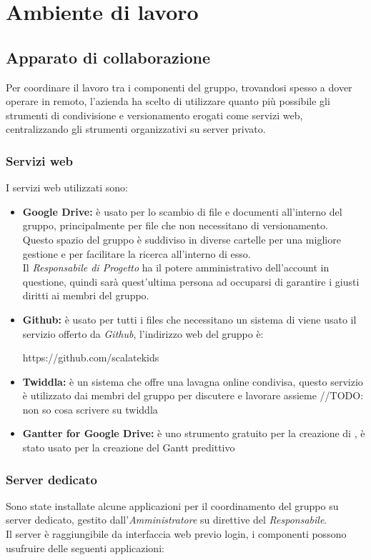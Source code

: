 \documentclass{scalatekids-article}
\begin{document}
\section{Ambiente di lavoro}
\subsection{Apparato di collaborazione}
Per coordinare il lavoro tra i componenti del gruppo, trovandosi spesso a dover
operare in remoto, l'azienda ha scelto di utilizzare quanto più possibile gli
strumenti di condivisione e versionamento erogati come servizi web,
centralizzando gli strumenti organizzativi su server privato.
\subsubsection{Servizi web}
I servizi web utilizzati sono:
\begin{itemize}
\item\textbf{Google Drive:} è usato per lo scambio di file e documenti all'interno del gruppo, principalmente per file che non necessitano di versionamento.\\
  Questo spazio del gruppo è suddiviso in diverse cartelle per una migliore gestione e per facilitare la ricerca all'interno di esso.\\
  Il \textit{Responsabile di Progetto} ha il potere amministrativo dell'account in questione, quindi sarà quest'ultima persona ad occuparsi di garantire i giusti diritti ai membri del gruppo.
\item\textbf{Github:} è usato per tutti i files che necessitano un sistema di  viene usato il servizio offerto da \textit{Github}, l'indirizzo web del gruppo è:\\
  \begin{center}
    https://github.com/scalatekids
  \end{center}
\item\textbf{Twiddla:} è un sistema che offre una lavagna online condivisa, questo servizio è utilizzato dai membri del gruppo per discutere e lavorare assieme //TODO: non so cosa scrivere su twiddla
\item\textbf{Gantter for Google Drive:} è uno strumento gratuito per la creazione di , è stato usato per la creazione del Gantt predittivo
\end{itemize}
\subsubsection{Server dedicato}
Sono state installate alcune applicazioni per il coordinamento del gruppo su
server dedicato, gestito dall'\textit{Amministratore} su direttive del
\textit{Responsabile}.\\ Il server è raggiungibile da interfaccia web previo
login, i componenti possono usufruire delle seguenti applicazioni:
\end{document}
